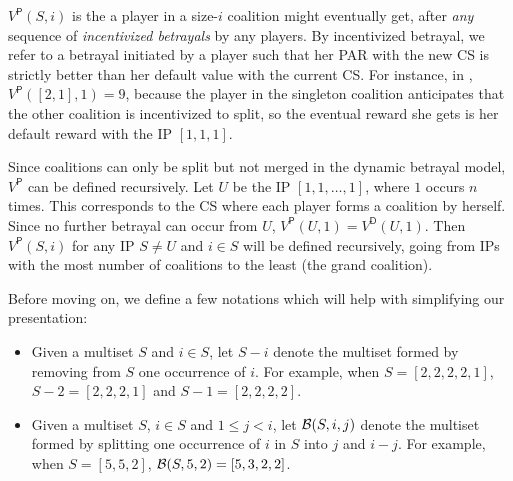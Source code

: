 \documentclass[11pt]{article}
\newcommand{\vp}{V^{\textsf{P}}}
\newcommand{\vd}{V^{\textsf{D}}}
\newcommand{\multiset}[1]{[#1]}
\begin{document}
$\vp(S,i)$ is the  a player in a size-$i$ coalition might eventually get,
after \emph{any} sequence of \emph{incentivized betrayals} by any players.
By incentivized betrayal, we refer to a betrayal initiated by a player such that her PAR with the new CS is strictly better than her default value with the current CS.
For instance, in , $\vp([2,1],1) = 9$, because the player in the singleton coalition anticipates that the other coalition is incentivized to split,
so the eventual reward she gets is her default reward with the IP $\multiset{1,1,1}$.

Since coalitions can only be split but not merged in the dynamic betrayal model, $\vp$ can be defined recursively.
Let $U$ be the IP $\multiset{1,1,\ldots,1}$, where $1$ occurs $n$ times.
This corresponds to the CS where each player forms a coalition by herself. Since no further betrayal can occur from $U$, $\vp(U,1) = \vd(U,1)$.
Then $\vp(S,i)$ for any IP $S\neq U$ and $i\in S$ will be defined recursively, going from IPs with the most number of coalitions to the least (the grand coalition).

Before moving on, we define a few notations which will help with simplifying our presentation:
\begin{itemize}[leftmargin=0.25in]
\item Given a multiset $S$ and $i\in S$, let $S-i$ denote the multiset formed by removing from $S$ one occurrence of $i$.
For example, when $S=\multiset{2,2,2,2,1}$, $S-2 = \multiset{2,2,2,1}$ and $S-1 = \multiset{2,2,2,2}$.
\item Given a multiset $S$, $i\in S$ and $1\le j<i$, let $\mathcal{B}(S,i,j)$ denote the multiset formed by splitting one occurrence of $i$ in $S$ into $j$ and $i-j$.
For example, when $S=\multiset{5,5,2}$, $\calB(S,5,2) = \multiset{5,3,2,2}$.
\end{itemize}
\end{document}
